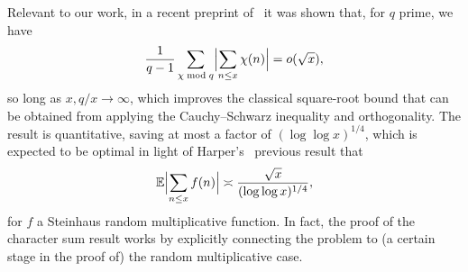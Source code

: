 \documentclass[a4paper,12pt,reqno]{amsart}
\newcommand{\E}{\mathbb{E}}
\begin{document}
Relevant to our work, in a recent preprint of~\citet[Theorem~1]{HarperTypical} it was shown that, for $q$ prime, we have
\[
\frac{1}{q-1} \sum_{\chi \bmod q} \Bigl| \sum_{n \leq x} \chi (n) \Bigr| = o (\sqrt{x} ),
\]
so long as $x, q/x \rightarrow \infty$, which improves the classical square-root bound that can be obtained from applying the Cauchy--Schwarz inequality and orthogonality. The result is quantitative, saving at most a factor of $(\log \log x)^{1/4}$, which is expected to be optimal in light of Harper's~\cite[Theorem~1]{HarperLM} previous result that
\[
\E \Bigl| \sum_{n \leq x} f(n) \Bigr| \asymp \frac{\sqrt{x}}{(\log \log x)^{1/4}} ,
\]
for $f$ a Steinhaus random multiplicative function. In fact, the proof of the character sum result works by explicitly connecting the problem to (a certain stage in the proof of) the random multiplicative case. 
\end{document}
